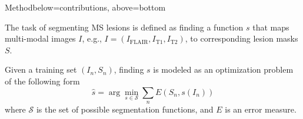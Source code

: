 \documentclass[%
landscape,
a0paper,
margin=2cm,
fontscale=0.3
]{baposter}
\begin{document}
\begin{poster}


\begin{headerblock}{Method}{below=contributions, above=bottom}
\begin{compactitem}

\item The task of segmenting MS lesions is defined as finding a function $s$
that maps multi-modal images $I$, e.g., $I = (I_\text{FLAIR}, I_\text{T1},
I_\text{T2})$, to corresponding lesion masks $S$.

\item Given a training set $(I_n,S_n)$, finding $s$ is modeled as an
optimization problem of the following form
\begin{equation}
\hat{s} = \arg \min_{s \in \mathcal{S}} \sum_n E(S_n, s(I_n))
\label{eq:segprob}
\end{equation}
where $\mathcal{S}$ is the set of possible segmentation functions, and $E$ is an
error measure.
\end{compactitem}
\end{headerblock}


\end{poster}
\end{document}
